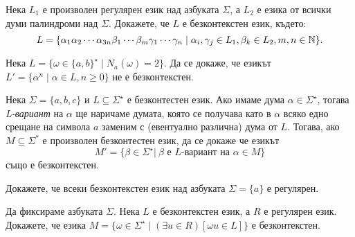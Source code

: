 \begin{problem}
  Нека $L_1$ е произволен регулярен език над азбуката $\Sigma$, 
  а $L_2$ е езика от всички думи палиндроми над $\Sigma$.
  Докажете, че $L$ е безконтекстен език, където:
  \[L = \{\alpha_1\alpha_2\cdots\alpha_{3n}\beta_1\cdots\beta_m\gamma_1\cdots\gamma_n \mid \alpha_i,\gamma_j \in L_1, \beta_k\in L_2, m,n \in \mathbb{N}\}.\]
\end{problem}

\begin{problem}
  Нека $L = \{\omega\in\{a,b\}^\star \mid N_a(\omega) = 2\}$.
  Да се докаже, че езикът $L' = \{\alpha^n \mid \alpha\in L, n \geq 0\}$ не е безконтекстен.
\end{problem}


\begin{problem}
  Нека $\Sigma = \{a,b,c\}$ и $L \subseteq \Sigma^\star$ е безконтестен език. Ако имаме дума 
  $\alpha \in \Sigma^\star$, тогава \emph{L-вариант} на $\alpha$ ще наричаме думата, която се получава като в $\alpha$ всяко едно 
  срещане на символа $a$ заменим с (евентуално различна) дума от $L$.
  Тогава, ако $M \subseteq \Sigma^*$ е произволен безконтестен език, да се докаже че езикът
  \begin{equation*}
    M' = \{\beta\in\Sigma^\star |\ \beta \text{ е $L$-вариант на } \alpha \in M \}
  \end{equation*}
  също е безконтекстен.
\end{problem}

\begin{problem}
  Докажете, че всеки безконтекстен език над азбуката $\Sigma = \{a\}$
  е регулярен.
\end{problem}

\begin{problem}
  Да фиксираме азбуката $\Sigma$.
  Нека $L$ е безконтекстен език, а $R$ е регулярен език.
  Докажете, че езика
  $M = \{\omega \in \Sigma^\star \mid (\exists u \in R)[\omega u \in L]\}$
  е безконтекстен.
\end{problem}




